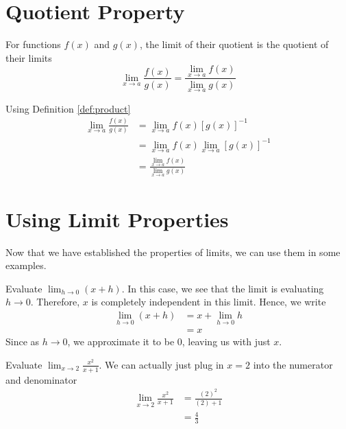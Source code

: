\documentclass[working]{tuftebook}
\begin{document}
\section{Quotient Property}
\begin{definition}
    For functions $f(x)$ and $g(x)$, the limit of their quotient is the quotient of their limits 
    \[
        \lim_{x\to a} \frac{f(x)}{g(x)}= \frac{ \lim_{x\to a}f(x)}{ \lim_{x\to a}g(x)}
    \]
\end{definition}
\begin{myproof}
    Using Definition \ref{def:product}
    \begin{align*}
        \lim_{x\to a} \frac{f(x)}{g(x)}&= \lim_{x\to a}f(x)[g(x)]^{-1}\\
                                       &= \lim_{x\to a}f(x) \lim_{x\to a}[g(x)]^{-1}\\ 
                                       &= \frac{ \lim_{x\to a}f(x)}{ \lim_{x\to a}g(x)}
    \end{align*}
\end{myproof}

\section{Using Limit Properties}
Now that we have established the properties of limits, we can use them in some examples. 

\begin{fullwidth}
\begin{eg}
    Evaluate $\displaystyle \lim_{h\to 0}(x+h)$. In this case, we see that the limit is evaluating $h\to0$. Therefore, $x$ is completely independent in this limit. Hence, we write
    \begin{align*}
        \lim_{h\to 0}(x+h)&=x+ \lim_{h\to 0}h\\ 
                          &=x
    \end{align*}
    Since as $h\to0$, we approximate it to be 0, leaving us with just $x$.
\end{eg}
\begin{eg}
    Evaluate $\displaystyle \lim_{x\to 2} \frac{x^2}{x+1}$. We can actually just plug in $x=2$ into the numerator and denominator 
    \begin{align*}
        \lim_{x\to 2} \frac{x^2}{x+1}&= \frac{(2)^2}{(2)+1}\\ 
                                     &= \frac{4}{3}
    \end{align*}
\end{eg}
\end{fullwidth}
\end{document}
